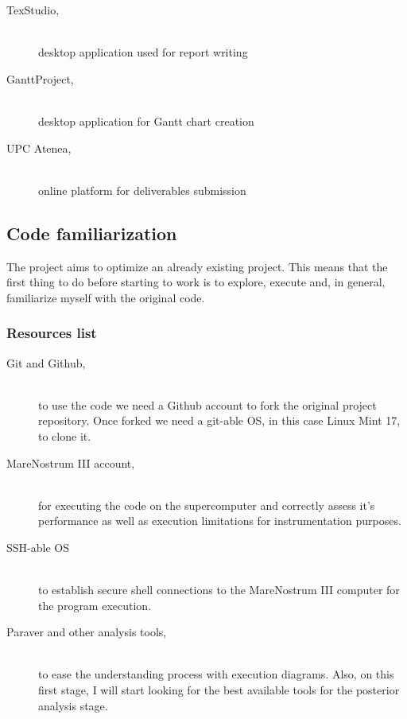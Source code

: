 \begin{description}
\item [TexStudio,] \hfill \\ desktop application used for report writing
\item [GanttProject,] \hfill \\ desktop application for Gantt chart creation
\item [UPC Atenea,] \hfill \\ online platform for deliverables submission
\end{description}

\subsection{Code familiarization}

The project aims to optimize an already existing project. This means that the first thing to do before starting to work is to explore, execute and, in general, familiarize myself with the original code. 

\subsubsection{Resources list}
\label{subsec:familiarresources}

\begin{description}
\item [Git and Github,] \hfill \\ to use the code we need a Github account to fork the original project repository. Once forked we need a git-able OS, in this case Linux Mint 17, to clone it. 
\item [MareNostrum III account,] \hfill \\ for executing the code on the supercomputer and correctly assess it's performance as well as execution limitations for instrumentation purposes.
\item [SSH-able OS] \hfill \\ to establish secure shell connections to the MareNostrum III computer for the program execution.
\item [Paraver and other analysis tools,] \hfill \\ to ease the understanding process with execution diagrams. Also, on this first stage, I will start looking for the best available tools for the posterior analysis stage.

\end{description}


